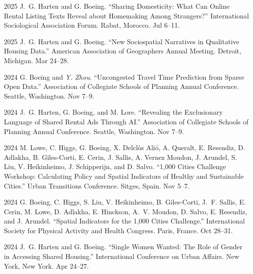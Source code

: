 \documentclass[11pt,letterpaper]{report} %
\begin{document}
    \begin{tablist}

        \item[2025] \tab{}J.~G. Harten and G. Boeing. \enquote{Sharing Domesticity: What Can Online Rental Listing Texts Reveal about Homemaking Among Strangers?} International Sociological Association Forum. Rabat, Morocco. Jul 6--11.


        \item[2025] \tab{}J.~G. Harten and G. Boeing. \enquote{New Sociospatial Narratives in Qualitative Housing Data.} American Association of Geographers Annual Meeting. Detroit, Michigan. Mar 24--28.

        \item[2024] \tab{}G. Boeing and \textit{Y. Zhou}. \enquote{Uncongested Travel Time Prediction from Sparse Open Data.} Association of Collegiate Schools of Planning Annual Conference. Seattle, Washington. Nov 7--9.

        \item[2024] \tab{}J.~G. Harten, G. Boeing, and M. Lore. \enquote{Revealing the Exclusionary Language of Shared Rental Ads Through AI.} Association of Collegiate Schools of Planning Annual Conference. Seattle, Washington. Nov 7--9.

        \item[2024] \tab{}M. Lowe, C. Higgs, G. Boeing, X. Delclòs Alió, A. Queralt, E. Resendiz, D. Adlakha, B. Giles-Corti, E. Cerin, J. Sallis, A. Vernez Moudon, J. Arundel, S. Liu, V. Heikinheimo, J. Schipperijn, and D. Salvo. \enquote{1,000 Cities Challenge Workshop: Calculating Policy and Spatial Indicators of Healthy and Sustainable Cities.} Urban Transitions Conference. Sitges, Spain. Nov 5--7.

        \item[2024] \tab{}G. Boeing, C. Higgs, S. Liu, V. Heikinheimo, B. Giles-Corti, J.~F. Sallis, E. Cerin, M. Lowe, D. Adlakha, E. Hinckson, A.~V. Moudon, D. Salvo, E. Resendiz, and J. Arundel. \enquote{Spatial Indicators for the 1,000 Cities Challenge.} International Society for Physical Activity and Health Congress. Paris, France. Oct 28--31.

        \item[2024] \tab{}J.~G. Harten and G. Boeing. \enquote{Single Women Wanted: The Role of Gender in Accessing Shared Housing.} International Conference on Urban Affairs. New York, New York. Apr 24--27.


\end{tablist}
\end{document}
